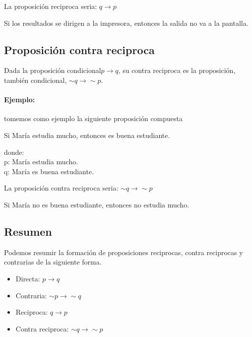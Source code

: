 \documentclass[a4paper,11pt,oneside,titlepage,final]{scrartc}
\begin{document}
\begin{flushleft}
La proposición reciproca seria: $q \longrightarrow p$\\
\end{flushleft}

\begin{center}
Si los resultados se dirigen a la impresora, entonces la salida no va a la pantalla.
\end{center}

\subsection{Proposición contra reciproca}

Dada la proposición condicional$p \longrightarrow q$, su contra reciproca es la proposición, también condicional, $ \sim q \longrightarrow \sim p$.\\

\paragraph{Ejemplo:}tomemos como ejemplo la siguiente proposición compuesta 

\begin{center}
Si María estudia mucho, entonces es buena estudiante.
\end{center}

\begin{flushleft}
donde:\\
p: María estudia mucho.\\
q: María es buena estudiante.\\
\end{flushleft}

\begin{flushleft}
La proposición contra reciproca seria: $ \sim q \longrightarrow \sim p$\\
\end{flushleft}

\begin{center}
Si María no es buena estudiante, entonces no estudia mucho.
\end{center}

\subsection{Resumen}

Podemos resumir la formación de proposiciones reciprocas, contra reciprocas y contrarias de la siguiente forma.
\begin{itemize}
\item Directa: $p \longrightarrow q$
\item Contraria: $ \sim p \longrightarrow \sim q$
\item Reciproca: $q \longrightarrow p$
\item Contra reciproca: $ \sim q \longrightarrow \sim p$
\end{itemize}
\end{document}
